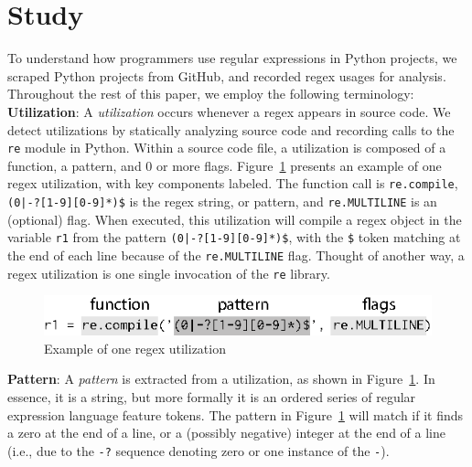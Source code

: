 \section{Study}
\label{sec:study}

To understand how programmers use regular expressions in Python projects, we scraped  Python projects from GitHub, and recorded regex usages for analysis. Throughout the rest of this paper, we  employ the following terminology:\\

\noindent \textbf{Utilization}: A \emph{utilization} occurs whenever a regex appears in source code.  We detect utilizations by statically analyzing source code and recording calls to the {\tt re} module in Python.
Within a source code file, a {utilization} is composed of a function, a pattern, and 0 or more flags.  Figure~\ref{fig:exampleUsage} presents an example of one regex {utilization}, with key components labeled. The function call is {\tt re.compile}, \verb!(0|-?[1-9][0-9]*)$! is the regex string, or pattern, and {\tt re.MULTILINE} is an (optional) flag. When executed, this {utilization}  will compile a regex object in the variable {\tt r1} from the pattern \verb!(0|-?[1-9][0-9]*)$!, with the \verb!$! token matching at the end of each line because of the {\tt re.MULTILINE} flag. Thought of another way, a regex  utilization is one single invocation of the {\tt re} library.\\

\begin{figure}[tb]
\centering
\includegraphics[width=\columnwidth]{../illustrations/exampleUsage.eps}
\vspace{-12pt}
\caption{Example of one regex utilization}
\vspace{-6pt}
\label{fig:exampleUsage}
\end{figure}

\noindent \textbf{Pattern}: A \emph{pattern} is extracted from a utilization, as shown in Figure~\ref{fig:exampleUsage}. In essence, it is a string, but more formally it is an ordered series of regular expression language feature tokens.  The pattern in Figure~\ref{fig:exampleUsage}  will match if it finds a zero at the end of a line, or a (possibly negative) integer at the end of a line (i.e., due to the {\tt -?} sequence denoting zero or one instance of the {\tt -}).

